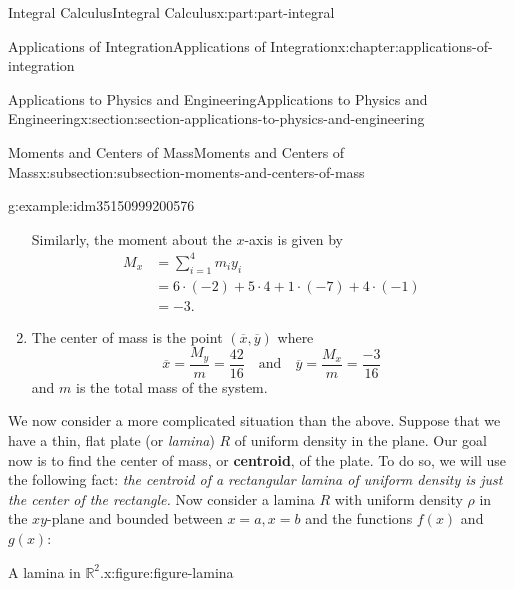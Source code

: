 \documentclass[twoside,10pt,]{tufte-book}
\newcommand{\terminology}[1]{\textbf{#1}}
\numberwithin{equation}{part}
\newcommand{\amp}{&}
\begin{document}
\begin{partptx}{Integral Calculus}{}{Integral Calculus}{}{}{x:part:part-integral}
\begin{chapterptx}{Applications of Integration}{}{Applications of Integration}{}{}{x:chapter:applications-of-integration}
\begin{sectionptx}{Applications to Physics and Engineering}{}{Applications to Physics and Engineering}{}{}{x:section:section-applications-to-physics-and-engineering}
\begin{subsectionptx}{Moments and Centers of Mass}{}{Moments and Centers of Mass}{}{}{x:subsection:subsection-moments-and-centers-of-mass}
\begin{example}{}{g:example:idm35150999200576}
\begin{enumerate}
%
\par
Similarly, the moment about the \(x\)-axis is given by%
\begin{align*}
M_{x}\amp= \sum_{i=1}^{4}m_{i}y_{i}\\
\amp= 6\cdot(-2)+5\cdot4+1\cdot(-7)+4\cdot(-1)\\
\amp= -3.
\end{align*}
%
\item{}The center of mass is the point \((\overline{x},\overline{y})\) where%
\begin{equation*}
\overline{x} = \frac{M_{y}}{m} = \frac{42}{16}\quad\text{and}\quad\overline{y}=\frac{M_{x}}{m} = \frac{-3}{16}
\end{equation*}
and \(m\) is the total mass of the system.%
\end{enumerate}
\end{example}
\textbraceright{} We now consider a more complicated situation than the above. Suppose that we have a thin, flat plate (or \emph{lamina}) \(R\) of uniform density in the plane. Our goal now is to find the center of mass, or \terminology{centroid}, of the plate. To do so, we will use the following fact: \emph{the centroid of a rectangular lamina of uniform density is just the center of the rectangle.} Now consider a lamina \(R\) with uniform density \(\rho\) in the \(xy\)-plane and bounded between \(x=a,x=b\) and the functions \(f(x)\) and \(g(x)\):%
\begin{figureptx}{A lamina in \(\mathbb{R}^{2}\).}{x:figure:figure-lamina}{}%
\begin{image}{0}{1}{0}%
\resizebox{\linewidth}{!}{%
\begin{tikzpicture}
\begin{axis}[
axis lines=middle,
xmin=-0.5,
xmax=8,
ymin=-5,
ymax=7,
domain=0.5:7.5,
xtick={0.75,6.25},
xticklabels={$a$,$b$},
ytick={0},
axis on top
]


\end{axis}
\end{tikzpicture}}
\end{image}
\end{figureptx}
\end{subsectionptx}
\end{sectionptx}
\end{chapterptx}
\end{partptx}
\end{document}

